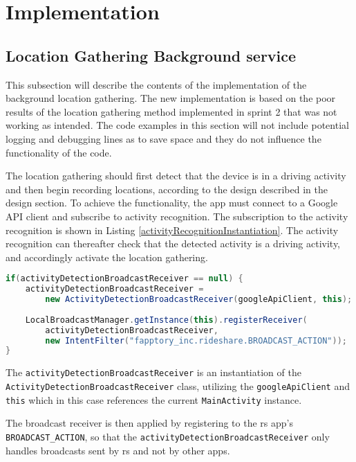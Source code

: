 \section{Implementation}

\subsection{Location Gathering Background service}
This subsection will describe the contents of the implementation of the background location gathering.
The new implementation is based on the poor results  of the location gathering method implemented in sprint 2 that was not working as intended.
The code examples in this section will not include potential logging and debugging lines as to save space and they do not influence the functionality of the code.


The location gathering should first detect that the device is in a driving activity and then begin recording locations, according to the design described in the design section.
To achieve the functionality, the app must connect to a Google API client and subscribe to activity recognition.
The subscription to the activity recognition is shown in Listing \ref{activityRecognitionInstantiation}.
The activity recognition can thereafter check that the detected activity is a driving activity, and accordingly activate the location gathering.

\begin{lstlisting}[language=Java, label=activityRecognitionInstantiation, caption=Initialization of activity recognition.]
if(activityDetectionBroadcastReceiver == null) {
	activityDetectionBroadcastReceiver = 
		new ActivityDetectionBroadcastReceiver(googleApiClient, this);
		
	LocalBroadcastManager.getInstance(this).registerReceiver(
		activityDetectionBroadcastReceiver, 
		new IntentFilter("fapptory_inc.rideshare.BROADCAST_ACTION"));
}
\end{lstlisting}

The \texttt{activityDetectionBroadcastReceiver} is an instantiation of the\\ \texttt{ActivityDetectionBroadcastReceiver} class, utilizing the \texttt{googleApiClient} and \texttt{this} which in this case references the current \texttt{MainActivity} instance.

The broadcast receiver is then applied by registering to the \gls{rs} app's\\ \texttt{BROADCAST\_ACTION}, so that the \texttt{activityDetectionBroadcastReceiver} only handles broadcasts sent by \gls{rs} and not by other apps.

